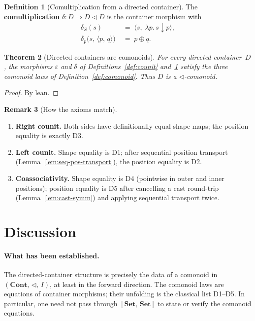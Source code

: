 \documentclass[11pt,a4paper]{article}
\theoremstyle{plain}
\newtheorem{theorem}{Theorem}[section]
\theoremstyle{definition}
\newtheorem{definition}[theorem]{Definition}
\newtheorem{remark}[theorem]{Remark}
\newcommand{\Cont}{\mathbf{Cont}}
\begin{document}
\begin{definition}[Comultiplication from a directed container]\label{def:comult}
The \textbf{comultiplication}
$\delta : D \Rightarrow D \mathbin{\triangleleft} D$ is the container morphism
with
\begin{align}
  \delta_S(s) &\;=\; \bigl\langle s,\; \lambda p.\, s \downarrow p \bigr\rangle,
  \\[4pt]
  \delta_p\bigl(s,\, \langle p,\, q\rangle\bigr)
  &\;=\; p \oplus q.
\end{align}
\end{definition}

\begin{theorem}[Directed containers are comonoids]\label{thm:to-comonoid}
For every directed container~$D$, the morphisms $\varepsilon$ and $\delta$ of
Definitions~\ref{def:counit} and~\ref{def:comult} satisfy the three comonoid
laws of Definition~\ref{def:comonoid}. Thus $D$ is a
$\triangleleft$-comonoid.
\end{theorem}

\begin{proof}
By lean.
\end{proof}

\begin{remark}[How the axioms match]
\begin{enumerate}
  \item \textbf{Right counit.} Both sides have definitionally equal shape
        maps; the position equality is exactly D3.
  \item \textbf{Left counit.} Shape equality is D1; after sequential position
        transport (Lemma~\ref{lem:seq-pos-transport}), the position equality
        is D2.
  \item \textbf{Coassociativity.} Shape equality is D4 (pointwise in outer
        and inner positions); position equality is D5 after cancelling a cast
        round-trip (Lemma~\ref{lem:cast-symm}) and applying sequential
        transport twice.
\end{enumerate}
\end{remark}

\section{Discussion}

\paragraph{What has been established.}
The directed-container structure is precisely the data of a comonoid in
$(\Cont,\, \triangleleft,\, I)$, at least in the forward direction. The
comonoid laws are equations of container morphisms; their unfolding is the
classical list D1--D5. In particular, one need not pass through
$[\mathbf{Set},\, \mathbf{Set}]$ to state or verify the comonoid equations.
\end{document}
